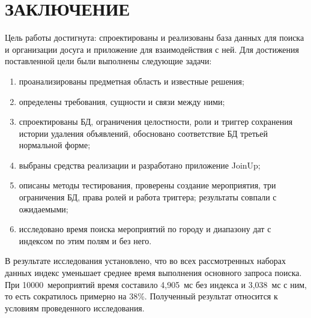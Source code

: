 \chapter*{ЗАКЛЮЧЕНИЕ}

Цель работы достигнута: спроектированы и реализованы база данных для поиска и организации досуга и приложение для взаимодействия с ней. Для достижения поставленной цели были выполнены следующие задачи:
\begin{enumerate}[label=\arabic*)]
    \item проанализированы предметная область и известные решения;
    \item определены требования, сущности и связи между ними;
    \item спроектированы БД, ограничения целостности, роли и триггер сохранения истории удаления объявлений, обосновано соответствие БД третьей нормальной форме;
    \item выбраны средства реализации и разработано приложение JoinUp;
    \item описаны методы тестирования, проверены создание мероприятия, три ограничения БД, права ролей и работа триггера; результаты совпали с ожидаемыми;
    \item исследовано время поиска мероприятий по городу и диапазону дат с индексом по этим полям и без него.
\end{enumerate}

В результате исследования установлено, что во всех рассмотренных наборах данных индекс уменьшает среднее время выполнения основного запроса поиска. При 10000~мероприятий время составило 4,905~мс без индекса и 3,038~мс с ним, то есть сократилось примерно на 38\%. Полученный результат относится к условиям проведенного исследования.

